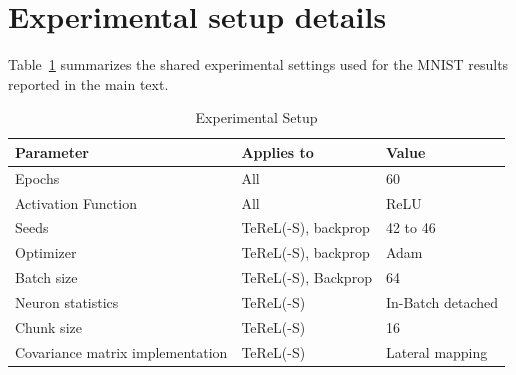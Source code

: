 \section{Experimental setup details}
\label{app:exp-setup}

\noindent Table~\ref{tab:setup} summarizes the shared experimental settings used for the MNIST results reported in the main text.

\begin{table}[h]

\caption{Experimental Setup}
\centering
\begin{tabular}{lll}
\toprule
\textbf{Parameter} & \textbf{Applies to} & \textbf{Value} \\
\midrule
Epochs & All & 60 \\
Activation Function & All & ReLU \\
Seeds & TeReL(-S), backprop & 42 to 46 \\
Optimizer & TeReL(-S), backprop & Adam \\
Batch size & TeReL(-S), Backprop & 64 \\
Neuron statistics & TeReL(-S) & In-Batch detached \\
Chunk size & TeReL(-S) & 16 \\
Covariance matrix implementation & TeReL(-S) & Lateral mapping \\
\bottomrule
\end{tabular}
\label{tab:setup}\end{table}
\FloatBarrier

